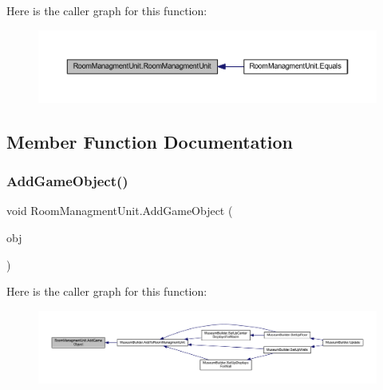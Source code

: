 Here is the caller graph for this function\+:
\nopagebreak
\begin{figure}[H]
\begin{center}
\leavevmode
\includegraphics[width=350pt]{class_room_managment_unit_ad9c4cf6c496f32f6e0edbe47a4bf0295_icgraph}
\end{center}
\end{figure}


\subsection{Member Function Documentation}
\mbox{\label{class_room_managment_unit_ac7f3f62eb0e6f9f0bb239266796a323a}} 
\subsubsection{\texorpdfstring{Add\+Game\+Object()}{AddGameObject()}}
{\footnotesize\ttfamily void Room\+Managment\+Unit.\+Add\+Game\+Object (\begin{DoxyParamCaption}\item[{Game\+Object}]{obj }\end{DoxyParamCaption})}

Here is the caller graph for this function\+:
\nopagebreak
\begin{figure}[H]
\begin{center}
\leavevmode
\includegraphics[width=350pt]{class_room_managment_unit_ac7f3f62eb0e6f9f0bb239266796a323a_icgraph}
\end{center}
\end{figure}
\mbox{\label{class_room_managment_unit_a663946fa33bad407b32d75aea8e7d5d9}} 
